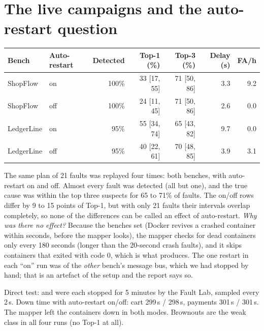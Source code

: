 \section{The live campaigns and the auto-restart question}
\begin{center}
\small
\begin{tabular}{llrrrrr}
\toprule
Bench & Auto-restart & Detected & Top-1 (\%) & Top-3 (\%) & Delay (s) & FA/h\\
\midrule
ShopFlow & on & 100\% & 33 [17, 55] & 71 [50, 86] & 3.3 & 9.2\\
ShopFlow & off & 100\% & 24 [11, 45] & 71 [50, 86] & 2.6 & 0.0\\
LedgerLine & on & 95\% & 55 [34, 74] & 65 [43, 82] & 9.7 & 0.0\\
LedgerLine & off & 95\% & 40 [22, 61] & 70 [48, 85] & 3.9 & 3.1\\
\bottomrule
\end{tabular}
\end{center}
\begin{simplebox}
The same plan of 21 faults was replayed four times: both benches, with auto-restart on and off. Almost every fault was detected (all but one), and the true cause was within the top three suspects for 65 to 71\% of faults. The on/off rows differ by 9 to 15 points of Top-1, but with only 21 faults their intervals overlap completely, so none of the differences can be called an effect of auto-restart. \emph{Why was there no effect?} Because the benches set  (Docker revives a crashed container within seconds, before the mapper looks), the mapper checks for dead containers only every 180 seconds (longer than the 20-second crash faults), and it skips containers that exited with code 0, which is what  produces. The one restart in each ``on'' run was of the \emph{other} bench's message bus, which we had stopped by hand; that is an artefact of the setup and the report says so.
\end{simplebox}

\begin{techbox}
Direct test:  and  were each stopped for 5 minutes by the Fault Lab, sampled every 2\,s. Down time with auto-restart on/off: cart 299\,s / 298\,s, payments 301\,s / 301\,s. The mapper left the containers down in both modes. Brownouts are the weak class in all four runs (no Top-1 at all).
\end{techbox}

